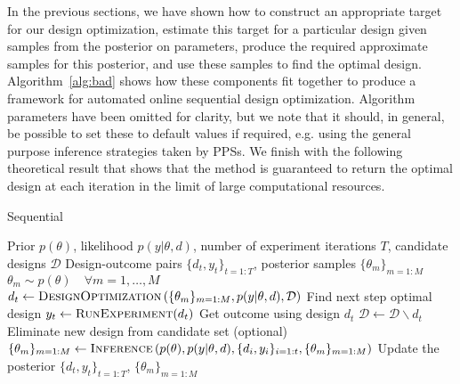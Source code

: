 In the previous sections, we have shown how to construct an appropriate target for our design optimization,
estimate this target for a particular design given samples from the posterior on parameters,
produce the required approximate samples for this posterior, and use these samples to find the optimal design.
Algorithm~\ref{alg:bad} shows how these components fit together to produce a framework for
automated online sequential design optimization.  Algorithm parameters have been omitted
for clarity, but we note that it should, in general, be possible to set these to default values if required, e.g. using
the general purpose inference strategies taken by PPSs.
We finish with the following theoretical result that
shows that the method is guaranteed to return the optimal design at each iteration in the limit of large
computational resources.
\begin{algorithm}[t]
	\small
	\captionsetup{labelfont=bf, justification=justified,singlelinecheck=false}
	\caption{Sequential \Bad \label{alg:bad}}
	\begin{algorithmic}[1]
		\renewcommand{\algorithmicrequire}{\textbf{Inputs:}}
		\renewcommand{\algorithmicensure}{\textbf{Outputs:}}				 
		\Require Prior $p(\theta)$, likelihood $p(y | \theta, d)$, number of experiment iterations $T$,
		candidate designs $\mathcal{D}$
		\Ensure Design-outcome pairs $\{d_t,y_t\}_{t=1:T}$, posterior samples $\{\theta_m\}_{m=1:M}$
		\State $\theta_m\sim p(\theta) \quad \forall m = 1, \dots, M$
		\State $d_t \leftarrow \textsc{DesignOptimization}\left(\{\theta_m\}_{m=1:M},p(y | \theta, d),
		\mathcal{D}\right)$ \Comment Find next step optimal design
		\State $y_t \leftarrow \textsc{RunExperiment}(d_t)$ \Comment Get outcome using design $d_t$
		\State $\mathcal{D}\leftarrow\mathcal{D}\backslash d_t$ 
		\Comment Eliminate new design from candidate set (optional)
		\State $\{\theta_m\}_{m=1:M} \leftarrow \textsc{Inference}\left(p(\theta),p(y | \theta, d),\{d_i,y_i\}_{i=1:t},
		\{\theta_m\}_{m=1:M} \right)$ 
		\Comment  Update the posterior
		\EndFor
		\State \Return $\{d_t,y_t\}_{t=1:T}$, $\{\theta_m\}_{m=1:M}$
	\end{algorithmic}
\end{algorithm}
